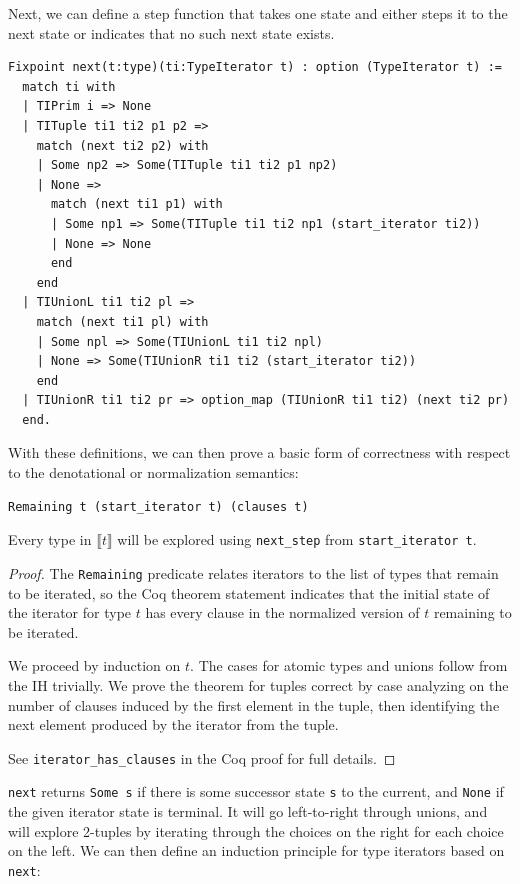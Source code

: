 \documentclass[a4paper,english]{lipics-v2019}
\newcommand{\denotes}[1]{\llbracket #1 \rrbracket}
\begin{document}
\noindent Next, we can define a step function that takes one state and either steps it
to the next state or indicates that no such next state exists.

\begin{small}\begin{verbatim}
Fixpoint next(t:type)(ti:TypeIterator t) : option (TypeIterator t) :=
  match ti with
  | TIPrim i => None
  | TITuple ti1 ti2 p1 p2 =>
    match (next ti2 p2) with
    | Some np2 => Some(TITuple ti1 ti2 p1 np2)
    | None =>
      match (next ti1 p1) with
      | Some np1 => Some(TITuple ti1 ti2 np1 (start_iterator ti2))
      | None => None
      end
    end
  | TIUnionL ti1 ti2 pl =>
    match (next ti1 pl) with
    | Some npl => Some(TIUnionL ti1 ti2 npl)
    | None => Some(TIUnionR ti1 ti2 (start_iterator ti2))
    end
  | TIUnionR ti1 ti2 pr => option_map (TIUnionR ti1 ti2) (next ti2 pr)
  end.
\end{verbatim}\end{small}

With these definitions, we can then prove a basic form of correctness with
respect to the denotational or normalization semantics:

\begin{theorem}\begin{verbatim}
Remaining t (start_iterator t) (clauses t)
\end{verbatim}
Every type in $\denotes{t}$ will be explored using \verb|next_step| from \verb|start_iterator t|. 
\end{theorem}
\begin{proof}
The \verb|Remaining| predicate relates iterators to the list of types that remain to be iterated, so
the Coq theorem statement indicates that the initial state of the iterator for type $t$ has every clause
in the normalized version of $t$ remaining to be iterated.

We proceed by induction on $t$. The cases for atomic types and unions follow
from the IH trivially. We prove the theorem for tuples correct by case analyzing
on the number of clauses induced by the first element in the tuple, then identifying
the next element produced by the iterator from the tuple.

See \verb|iterator_has_clauses| in the Coq proof for full details.
\end{proof}

\verb|next| returns \verb|Some s| if there is some successor state
\verb|s| to the current, and \verb|None| if the given iterator state is
terminal. It will go left-to-right through unions, and will explore 2-tuples
by iterating through the choices on the right for each choice on the left. We can
then define an induction principle for type iterators based on \verb|next|:
\end{document}
